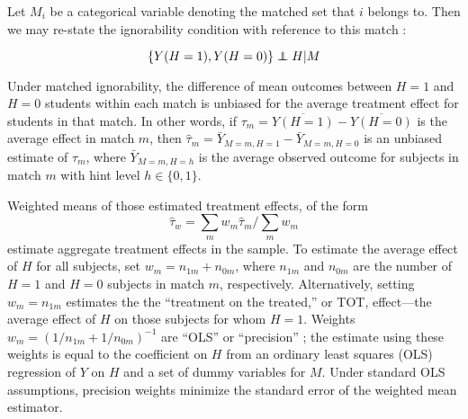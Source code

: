 \documentclass{article}\usepackage[]{graphicx}\usepackage[]{color}
\newenvironment{ass}[2][Assumption:]{\begin{trivlist}
\item[\hskip \labelsep {\bfseries #1}\hskip \labelsep {\bfseries #2}.]}{\end{trivlist}}
\def\independenT#1#2{\mathrel{\rlap{$#1#2$}\mkern2mu{#1#2}}}
\newcommand\independent{\protect\mathpalette{\protect\independenT}{\perp}}
\begin{document}
Let $M_i$ be a categorical variable denoting the matched set that $i$
belongs to.
Then we may re-state the ignorability condition with reference to this
match \citep[c.f.][]{rebar}:
\begin{ass}{Matched Ignorability}
\begin{equation*}
 \{Y(H=1),Y(H=0)\}\independent H |M
\end{equation*}
\end{ass}
Under matched ignorability, the difference of mean outcomes between $H=1$ and
$H=0$ students within each match is unbiased for the average treatment
effect for students in that match.
In other words, if $\tau_m=\overline{Y(H=1)}-\overline{Y(H=0)}$ is the
average effect in match $m$, then
$\hat{\tau}_m=\bar{Y}_{M=m,H=1}-\bar{Y}_{M=m,H=0}$ is an unbiased
estimate of $\tau_m$, where $\bar{Y}_{M=m,H=h}$ is the average
observed outcome for subjects in match $m$ with hint level
$h\in\{0,1\}$.

Weighted means of those estimated treatment effects, of the form
\begin{equation}\label{eq:tauWeightedMean}
\hat{\tau}_w=\sum_m w_m\hat{\tau}_m/\sum_m w_m
\end{equation}
estimate aggregate
treatment effects in the sample.
To estimate the average effect of $H$ for all subjects, set $w_m=
n_{1m}+n_{0m}$, where $n_{1m}$ and $n_{0m}$ are the number of
$H=1$ and $H=0$ subjects in match $m$, respectively.
Alternatively, setting $w_m=n_{1m}$ estimates the the ``treatment on the
treated,'' or TOT, effect---the average effect of
$H$ on those subjects for whom $H=1$.
Weights $w_m=(1/n_{1m}+1/n_{0m})^{-1}$ are ``OLS'' or
``precision'' \citep[c.f.][]{schochet2015statistical}; the
estimate using these weights is equal to the coefficient on $H$ from
an ordinary least squares (OLS) regression of $Y$ on $H$ and a set of dummy
variables for $M$.
Under standard OLS assumptions, precision weights minimize the
standard error of the weighted mean estimator.
\end{document}

